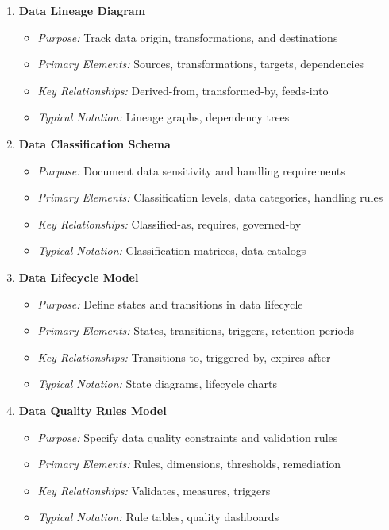 \documentclass[11pt,letterpaper]{article}
\begin{document}
\begin{enumerate}[label=\textbf{MT\arabic*:}, leftmargin=2.5em]
    \item \textbf{Data Lineage Diagram}
    \begin{itemize}[nosep]
        \item \textit{Purpose:} Track data origin, transformations, and destinations
        \item \textit{Primary Elements:} Sources, transformations, targets, dependencies
        \item \textit{Key Relationships:} Derived-from, transformed-by, feeds-into
        \item \textit{Typical Notation:} Lineage graphs, dependency trees
    \end{itemize}
    
    \item \textbf{Data Classification Schema}
    \begin{itemize}[nosep]
        \item \textit{Purpose:} Document data sensitivity and handling requirements
        \item \textit{Primary Elements:} Classification levels, data categories, handling rules
        \item \textit{Key Relationships:} Classified-as, requires, governed-by
        \item \textit{Typical Notation:} Classification matrices, data catalogs
    \end{itemize}
    
    \item \textbf{Data Lifecycle Model}
    \begin{itemize}[nosep]
        \item \textit{Purpose:} Define states and transitions in data lifecycle
        \item \textit{Primary Elements:} States, transitions, triggers, retention periods
        \item \textit{Key Relationships:} Transitions-to, triggered-by, expires-after
        \item \textit{Typical Notation:} State diagrams, lifecycle charts
    \end{itemize}
    
    \item \textbf{Data Quality Rules Model}
    \begin{itemize}[nosep]
        \item \textit{Purpose:} Specify data quality constraints and validation rules
        \item \textit{Primary Elements:} Rules, dimensions, thresholds, remediation
        \item \textit{Key Relationships:} Validates, measures, triggers
        \item \textit{Typical Notation:} Rule tables, quality dashboards
    \end{itemize}
    

\end{enumerate}
\end{document}
